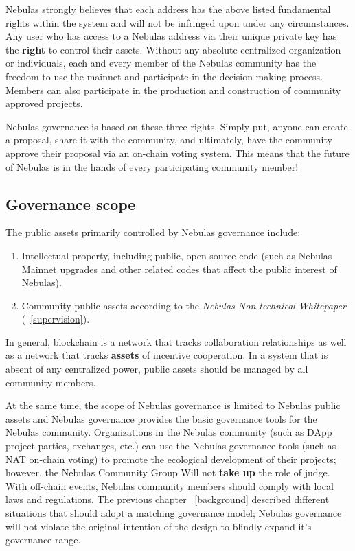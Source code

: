 Nebulas strongly believes that each address has the above listed fundamental rights within the system and will not be infringed upon under any circumstances. Any user who has access to a Nebulas address via their unique private key has the \textbf{right} to control their assets. Without any absolute centralized organization or individuals, each and every member of the Nebulas community has the freedom to use the mainnet and participate in the decision making process. Members can also participate in the production and construction of community approved projects. 

Nebulas governance is based on these three rights. Simply put, anyone can create a proposal, share it with the community, and ultimately, have the community approve their proposal via an on-chain voting system. This means that the future of Nebulas is in the hands of every participating community member!

\subsection{Governance scope}


The public assets primarily controlled by Nebulas governance include:

\begin{enumerate}
	\item Intellectual property, including public, open source code (such as Nebulas Mainnet upgrades and other related codes that affect the public interest of Nebulas).
	\item Community public assets according to the \textit{Nebulas Non-technical Whitepaper} (~\ref{supervision}).
\end{enumerate}

In general, blockchain is a network that tracks collaboration relationships as well as a network that tracks \textbf{assets} of incentive cooperation. In a system that is absent of any centralized power, public assets should be managed by all community members.

At the same time, the scope of Nebulas governance is limited to Nebulas public assets and Nebulas governance provides the basic governance tools for the Nebulas community. Organizations in the Nebulas community (such as DApp project parties, exchanges, etc.) can use the Nebulas governance tools (such as NAT on-chain voting) to promote the ecological development of their projects; however, the Nebulas Community Group Will not \textbf{take up} the role of judge. With off-chain events, Nebulas community members should comply with local laws and regulations. The previous chapter ~\ref{background} described different situations that should adopt a matching governance model; Nebulas governance will not violate the original intention of the design to blindly expand it's governance range.

